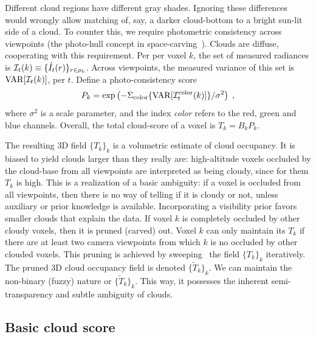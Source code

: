 \documentclass[runningheads]{llncs}
\begin{document}
Different cloud regions have different gray shades. Ignoring these differences would wrongly allow matching of, say, a darker cloud-bottom to a bright sun-lit side of a cloud. To counter this, we require photometric consistency across viewpoints (the photo-hull concept in space-carving~\cite{Kutulakos2000}). Clouds are diffuse, cooperating with this requirement. Per per voxel $k$, the set of measured radiances is \mbox{${\cal I}_t(k)\equiv\{\hat I_t(r)\}_{r\in\rho_k}$}. Across viewpoints, the measured variance of this set is ${\rm VAR}[{\cal I}_t(k)]$, per $t$. Define a photo-consistency score
\begin{equation}
 P_k= \exp\left(
         -\Sigma_{\rm color}\{{\rm VAR}[{\cal I}_t^{\rm color}(k)]\}/\sigma^2
         \right)
  \;,
 \label{eq:Ak}
\end{equation}
where $\sigma^2$ is a scale parameter, and the index {\em color} refers to the red, green and blue channels. Overall, the total cloud-score of a voxel is $T_k=B_kP_k$.

The resulting 3D field $\{T_k\}_k$ is a volumetric estimate of cloud occupancy. It is biased to yield clouds larger than they really are: high-altitude voxels occluded by the cloud-base from all viewpoints are interpreted as being cloudy, since for them $T_k$ is high. This is a realization of a basic ambiguity: if a voxel is occluded from all viewpoints, then there is no way of telling if it is cloudy or not, unless auxiliary or prior knowledge is available. Incorporating a visibility prior favors smaller clouds that explain the data. If voxel $k$ is completely occluded by other cloudy voxels, then it is pruned (carved) out. Voxel $k$ can only maintain its $T_k$ if there are at least two camera viewpoints from which $k$ is no occluded by other clouded voxels. This pruning is achieved by sweeping~\cite{Kutulakos2000} the field $\{T_k\}_k$ iteratively. The pruned 3D cloud occupancy field is denoted $\{\tilde T_k\}_k$. We can maintain the non-binary (fuzzy) nature or $\{\tilde T_k\}_k$. This way, it possesses the inherent semi-transparency and subtle ambiguity of clouds.

\subsection*{Basic cloud score}
\label{sec:cloudscore}
\end{document}
